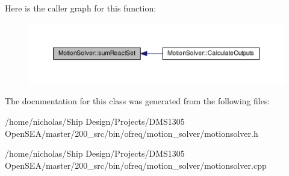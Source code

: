 Here is the caller graph for this function\-:\nopagebreak
\begin{figure}[H]
\begin{center}
\leavevmode
\includegraphics[width=350pt]{class_motion_solver_ae236a6bf04932d75d4e98052ef10d918_icgraph}
\end{center}
\end{figure}




The documentation for this class was generated from the following files\-:\begin{DoxyCompactItemize}
\item 
/home/nicholas/\-Ship Design/\-Projects/\-D\-M\-S1305 Open\-S\-E\-A/master/200\-\_\-src/bin/ofreq/motion\-\_\-solver/motionsolver.\-h\item 
/home/nicholas/\-Ship Design/\-Projects/\-D\-M\-S1305 Open\-S\-E\-A/master/200\-\_\-src/bin/ofreq/motion\-\_\-solver/motionsolver.\-cpp\end{DoxyCompactItemize}
